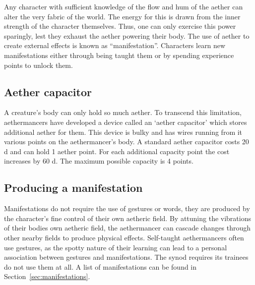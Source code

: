 \documentclass[a4paper,11pt,oneside]{book}
\begin{document}
Any character with sufficient knowledge of the flow and hum of the aether can alter the very fabric of the world.  The energy for this is drawn from the inner strength of the character themselves. Thus, one can only exercise this power sparingly, lest they exhaust the aether powering their body. The use of aether to create external effects is known as ``manifestation''. Characters learn new manifestations either through being taught them or by spending experience points to unlock them.

\subsection{Aether capacitor}
\label{sec:capacitor}
A creature's body can only hold so much aether. To transcend this limitation, aethermancers have developed a device called an `aether capacitor' which stores additional aether for them. This device is bulky and has wires running from it various points on the aethermancer's body. A standard aether capacitor costs 20 d and can hold 1 aether point. For each additional capacity point the cost increases by 60 d. The maximum possible capacity is 4 points.


\subsection{Producing a manifestation}
Manifestations do not require the use of gestures or words, they are produced by the character's fine control of their own aetheric field. By attuning the vibrations of their bodies own aetheric field, the aethermancer can cascade changes through other nearby fields to produce physical effects. Self-taught aethermancers often use gestures, as the spotty nature of their learning can lead to a personal association between gestures and manifestations. The synod requires its trainees do not use them at all. A list of manifestations can be found in Section~\ref{sec:manifestations}.
\end{document}
